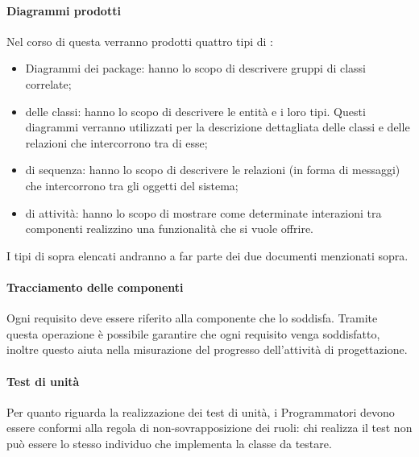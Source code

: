                         \paragraph*{Diagrammi prodotti}
                        Nel corso di questa  verranno prodotti quattro tipi di  :
                        \begin{itemize}
			\item Diagrammi dei package: hanno lo scopo di descrivere gruppi di classi correlate;
                        \item {} delle classi: hanno lo scopo di descrivere le entità e i loro tipi. Questi diagrammi
                                                verranno utilizzati per la descrizione dettagliata delle classi e delle relazioni che intercorrono tra di
                                                esse;
               
                        \item {} di sequenza:  hanno lo scopo di descrivere le relazioni (in forma di messaggi) che intercorrono tra gli oggetti del sistema;
                        \item {} di attivit\`a: hanno lo scopo di mostrare come determinate interazioni tra componenti
                                                realizzino una funzionalità che si vuole offrire.
                        \end{itemize}
                        I tipi di  sopra elencati andranno a far parte dei due documenti menzionati sopra.
		
			\paragraph*{Tracciamento delle componenti}
			Ogni requisito deve essere riferito alla componente che lo soddisfa. Tramite questa operazione è possibile garantire che ogni requisito venga
			soddisfatto, inoltre questo aiuta nella misurazione del progresso dell'attività di progettazione.		
			
			\paragraph*{Test di unità}
			Per quanto riguarda la realizzazione dei test di unità, i Programmatori devono essere conformi 
			alla regola di non-sovrapposizione dei ruoli: chi realizza il test non può essere lo stesso individuo 
			che implementa la classe da testare.
		
